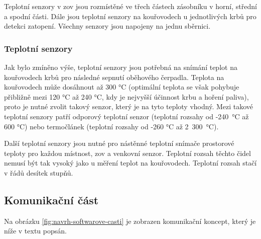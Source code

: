 Teplotní senzory v \acrshort{zov} jsou rozmístěné ve třech částech zásobníku v horní, střední a spodní části. Dále jsou teplotní senzory na kouřovodech u jednotlivých krbů pro detekci zatopení. Všechny senzory jsou napojeny na jednu sběrnici.



\subsubsection{Teplotní senzory}
Jak bylo zmíněno výše, teplotní senzory jsou potřebná na snímání teplot na kouřovodech krbů pro následné sepnutí oběhového čerpadla. Teplota na kouřovodech může dosáhnout až 300 °C (optimální teplota se však pohybuje přibližně mezi 120 °C až 240 °C, kdy je nejvyšší účinnost krbu a hoření paliva), proto je nutné zvolit takový senzor, který je na tyto teploty vhodný. Mezi takové teplotní senzory patří odporový teplotní senzor (teplotní rozsahy od -240~°C až 600 °C) nebo termočlánek (teplotní rozsahy od -260 °C až 2~300~°C). %


Další teplotní senzory jsou nutné pro nástěnné teplotní snímače prostorové teploty pro každou místnost, \acrshort{zov} a venkovní senzor. Teplotní rozsah těchto čidel nemusí být tak vysoký jako u měření teplot na kouřovodech. Teplotní rozsah stačí v řádů desítek stupňů. %

\subsection{Komunikační část}

Na obrázku \ref{fig:navrh-softwarove-casti} je zobrazen komunikační koncept, který je níže v textu popsán.

